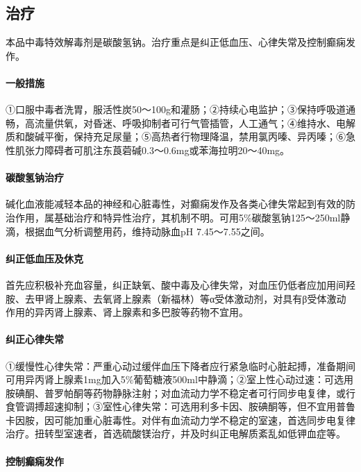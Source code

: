 \subsection{治疗}

本品中毒特效解毒剂是碳酸氢钠。治疗重点是纠正低血压、心律失常及控制癫痫发作。

\paragraph{一般措施}

①口服中毒者洗胃，服活性炭50～100g和灌肠；②持续心电监护；③保持呼吸道通畅，高流量供氧，对昏迷、呼吸抑制者可行气管插管，人工通气；④维持水、电解质和酸碱平衡，保持充足尿量；⑤高热者行物理降温，禁用氯丙嗪、异丙嗪；⑥急性肌张力障碍者可肌注东莨菪碱0.3～0.6mg或苯海拉明20～40mg。

\paragraph{碳酸氢钠治疗}

碱化血液能减轻本品的神经和心脏毒性，对癫痫发作及各类心律失常起到有效的防治作用，属基础治疗和特异性治疗，其机制不明。可用5\%碳酸氢钠125～250ml静滴，根据血气分析调整用药，维持动脉血pH
7.45～7.55之间。

\paragraph{纠正低血压及休克}

首先应积极补充血容量，纠正缺氧、酸中毒及心律失常，对血压仍低者应加用间羟胺、去甲肾上腺素、去氧肾上腺素（新福林）等α受体激动剂，对具有β受体激动作用的异丙肾上腺素、肾上腺素和多巴胺等药物不宜用。

\paragraph{纠正心律失常}

①缓慢性心律失常：严重心动过缓伴血压下降者应行紧急临时心脏起搏，准备期间可用异丙肾上腺素1mg加入5\%葡萄糖液500ml中静滴；②室上性心动过速：可选用胺碘酮、普罗帕酮等药物静脉注射；对血流动力学不稳定者可行同步电复律，或行食管调搏超速抑制；③室性心律失常：可选用利多卡因、胺碘酮等，但不宜用普鲁卡因胺，因可能加重心脏毒性。对伴有血流动力学不稳定的室速，首选同步电复律治疗。扭转型室速者，首选硫酸镁治疗，并及时纠正电解质紊乱如低钾血症等。

\paragraph{控制癫痫发作}

